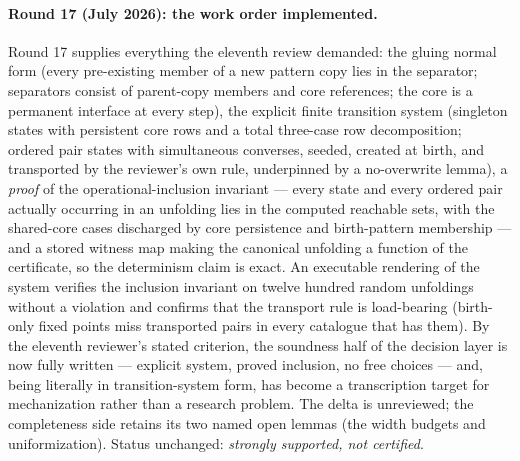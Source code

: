 \documentclass[
]{ceurart}
\theoremstyle{definition}
\begin{document}
\paragraph{Round 17 (July 2026): the work order implemented.}
Round 17 supplies everything the eleventh review demanded: the gluing
normal form (every pre-existing member of a new pattern copy lies in
the separator; separators consist of parent-copy members and core
references; the core is a permanent interface at every step), the
explicit finite transition system (singleton states with persistent
core rows and a total three-case row decomposition; ordered pair states
with simultaneous converses, seeded, created at birth, and transported
by the reviewer's own rule, underpinned by a no-overwrite lemma), a
\emph{proof} of the operational-inclusion invariant --- every state and
every ordered pair actually occurring in an unfolding lies in the
computed reachable sets, with the shared-core cases discharged by core
persistence and birth-pattern membership --- and a stored witness map
making the canonical unfolding a function of the certificate, so the
determinism claim is exact.  An executable rendering of the system
verifies the inclusion invariant on twelve hundred random unfoldings
without a violation and confirms that the transport rule is
load-bearing (birth-only fixed points miss transported pairs in every
catalogue that has them).  By the eleventh reviewer's stated criterion,
the soundness half of the decision layer is now fully written ---
explicit system, proved inclusion, no free choices --- and, being
literally in transition-system form, has become a transcription target
for mechanization rather than a research problem.  The delta is
unreviewed; the completeness side retains its two named open lemmas
(the width budgets and uniformization).  Status unchanged:
\emph{strongly supported, not certified}.
\end{document}
